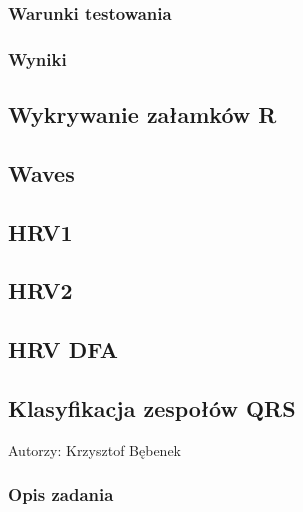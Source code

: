 \documentclass[a4paper, 11pt]{article}
\begin{document}
\subsubsection{Warunki testowania}
\label{sec:baseline:tests}

\subsubsection{Wyniki}
\label{sec:baseline:results}

\subsection{Wykrywanie załamków R}
\label{sec:Rs}

\subsection{Waves}
\label{sec:waves}

\subsection{HRV1}
\label{sec:hrv1}

\subsection{HRV2}
\label{sec:hrv2}

\subsection{HRV DFA}
\label{sec:hrvd_fa}

\subsection{Klasyfikacja zespołów QRS}
\label{sec:qrs_class}
Autorzy: Krzysztof Bębenek

\subsubsection{Opis zadania}
\label{sec:qrs_class:desc}
\end{document}
